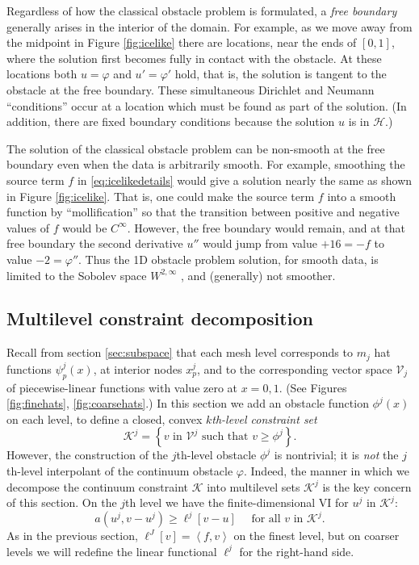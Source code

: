 \documentclass[letterpaper,final,12pt,reqno]{amsart}
\theoremstyle{claim}
\newcommand{\ip}[2]{\left<#1,#2\right>}
\numberwithin{equation}{section}
\numberwithin{figure}{section}
\numberwithin{table}{section}
\begin{document}
Regardless of how the classical obstacle problem is formulated, a \emph{free boundary} generally arises in the interior of the domain.  For example, as we move away from the midpoint in Figure \ref{fig:icelike} there are locations, near the ends of $[0,1]$, where the solution first becomes fully in contact with the obstacle.  At these locations both $u=\varphi$ and $u'=\varphi'$ hold, that is, the solution is tangent to the obstacle at the free boundary.  These simultaneous Dirichlet and Neumann ``conditions'' occur at a location which must be found as part of the solution.  (In addition, there are fixed boundary conditions because the solution $u$ is in $\mathcal{H}$.)

The solution of the classical obstacle problem can be non-smooth at the free boundary even when the data is arbitrarily smooth.  For example, smoothing the source term $f$ in \eqref{eq:icelikedetails} would give a solution nearly the same as shown in Figure \ref{fig:icelike}.  That is, one could make the source term $f$ into a smooth function by ``mollification'' \cite{Evans2010} so that the transition between positive and negative values of $f$ would be $C^\infty$.  However, the free boundary would remain, and at that free boundary the second derivative $u''$ would jump from value $+16=-f$ to value $-2=\varphi''$.  Thus the 1D obstacle problem solution, for smooth data, is limited to the Sobolev space $W^{2,\infty}$ \cite[section IV.6]{KinderlehrerStampacchia1980}, and (generally) not smoother.

\subsection*{Multilevel constraint decomposition}  Recall from section \ref{sec:subspace} that each mesh level corresponds to $m_j$ hat functions $\psi_p^j(x)$, at interior nodes $x_p^j$, and to the corresponding vector space $\mathcal{V}_j$ of piecewise-linear functions with value zero at $x=0,1$.  (See Figures \ref{fig:finehats}, \ref{fig:coarsehats}.)  In this section we add an obstacle function $\phi^j(x)$ on each level, to define a closed, convex $k$\emph{th-level constraint set}
\begin{equation}
\mathcal{K}^j = \left\{v \text{ in } \mathcal{V}^j \text{ such that } v \ge \phi^j\right\}.  \label{eq:levelKdefine}
\end{equation}
However, the construction of the $j$th-level obstacle $\phi^j$ is nontrivial; it is \emph{not} the $j$th-level interpolant of the continuum obstacle $\varphi$.  Indeed, the manner in which we decompose the continuum constraint $\mathcal{K}$ into multilevel sets $\mathcal{K}^j$ is the key concern of this section.  On the $j$th level we have the finite-dimensional VI for $u^j$ in $\mathcal{K}^j$:
\begin{equation}
  a(u^j,v-u^j) \ge \ell^j[v-u] \quad \text{ for all } v \text{ in } \mathcal{K}^j. \label{eq:levelvi}
\end{equation}
As in the previous section, $\ell^J[v]=\ip{f}{v}$ on the finest level, but on coarser levels we will redefine the linear functional $\ell^j$ for the right-hand side.
\end{document}
